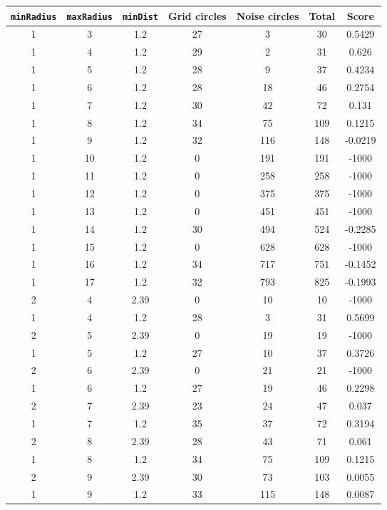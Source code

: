 \documentclass[letterpaper, 12pt]{article}
\begin{document}
\begin{longtable}{|c|c|c|c|c|c|c|}
\hline
\textbf{\texttt{minRadius}} & \textbf{\texttt{maxRadius}} & \textbf{\texttt{minDist}} & \textbf{Grid circles} & \textbf{Noise circles} & \textbf{Total} & \textbf{Score} \\
\hline
1 & 3 & 1.2 & 27 & 3 & 30 & 0.5429 \\
\hline
1 & 4 & 1.2 & 29 & 2 & 31 & 0.626 \\
\hline
1 & 5 & 1.2 & 28 & 9 & 37 & 0.4234 \\
\hline
1 & 6 & 1.2 & 28 & 18 & 46 & 0.2754 \\
\hline
1 & 7 & 1.2 & 30 & 42 & 72 & 0.131 \\
\hline
1 & 8 & 1.2 & 34 & 75 & 109 & 0.1215 \\
\hline
1 & 9 & 1.2 & 32 & 116 & 148 & -0.0219 \\
\hline
1 & 10 & 1.2 & 0 & 191 & 191 & -1000 \\
\hline
1 & 11 & 1.2 & 0 & 258 & 258 & -1000 \\
\hline
1 & 12 & 1.2 & 0 & 375 & 375 & -1000 \\
\hline
1 & 13 & 1.2 & 0 & 451 & 451 & -1000 \\
\hline
1 & 14 & 1.2 & 30 & 494 & 524 & -0.2285 \\
\hline
1 & 15 & 1.2 & 0 & 628 & 628 & -1000 \\
\hline
1 & 16 & 1.2 & 34 & 717 & 751 & -0.1452 \\
\hline
1 & 17 & 1.2 & 32 & 793 & 825 & -0.1993 \\
\hline
2 & 4 & 2.39 & 0 & 10 & 10 & -1000 \\
\hline
1 & 4 & 1.2 & 28 & 3 & 31 & 0.5699 \\
\hline
2 & 5 & 2.39 & 0 & 19 & 19 & -1000 \\
\hline
1 & 5 & 1.2 & 27 & 10 & 37 & 0.3726 \\
\hline
2 & 6 & 2.39 & 0 & 21 & 21 & -1000 \\
\hline
1 & 6 & 1.2 & 27 & 19 & 46 & 0.2298 \\
\hline
2 & 7 & 2.39 & 23 & 24 & 47 & 0.037 \\
\hline
1 & 7 & 1.2 & 35 & 37 & 72 & 0.3194 \\
\hline
2 & 8 & 2.39 & 28 & 43 & 71 & 0.061 \\
\hline
1 & 8 & 1.2 & 34 & 75 & 109 & 0.1215 \\
\hline
2 & 9 & 2.39 & 30 & 73 & 103 & 0.0055 \\
\hline
1 & 9 & 1.2 & 33 & 115 & 148 & 0.0087 \\

\end{longtable}
\end{document}
